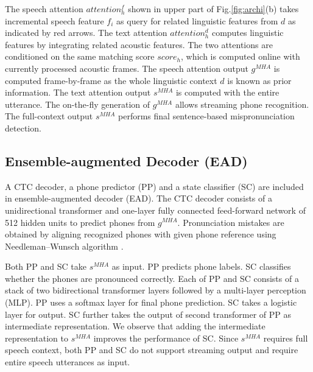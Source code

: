 \documentclass[a4paper]{article}
\begin{document}
The speech attention $attention^f_h$ shown in upper part of Fig.\ref{fig:archi}(b) takes incremental speech feature $f_i$ as query for %
related linguistic features from $d$ as indicated by red arrows. The text attention $attention^d_h$ computes linguistic features by integrating related acoustic features. The two attentions are conditioned on the same matching score $score_h$, which is computed online with currently processed acoustic frames. The speech attention output $g^{MHA}$ is computed frame-by-frame as the whole linguistic context $d$ is known as prior information. The text attention output $s^{MHA}$  is computed with the entire utterance.
The on-the-fly generation of $g^{MHA}$ allows streaming phone recognition. The full-context output $s^{MHA}$ performs final sentence-based mispronunciation detection. 

\subsection{Ensemble-augmented Decoder (EAD)}
A CTC decoder, a phone predictor (PP) and a state classifier (SC) are included in ensemble-augmented decoder (EAD). 
The CTC decoder consists of a unidirectional transformer and one-layer fully connected feed-forward network of 512 hidden units to predict phones from $g^{MHA}$. Pronunciation mistakes are obtained by aligning recognized phones with given phone reference using Needleman–Wunsch algorithm \cite{needleman1970general}. %

Both PP and SC take $s^{MHA}$ as input. PP predicts phone labels. SC classifies whether the phones are pronounced correctly. Each of PP and SC consists of a stack of two bidirectional transformer layers followed by a multi-layer perception (MLP). %
PP uses a softmax layer for final phone prediction. SC takes a logistic layer for output.
SC further takes the output of second transformer of PP as intermediate representation. We observe that adding the intermediate representation to $s^{MHA}$ improves the performance of SC. Since $s^{MHA}$ requires full speech context, both PP and SC do not support streaming output and require entire speech utterances as input. %
\end{document}
